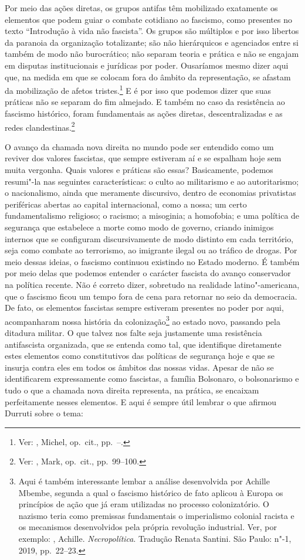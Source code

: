 Por meio das ações diretas, os grupos antifas têm mobilizado
exatamente os elementos que podem guiar o combate cotidiano ao fascismo,
como presentes no texto ``Introdução à vida não fascista''. Os
grupos são múltiplos e por isso libertos da paranoia da organização
totalizante; são não hierárquicos e agenciados entre si também
de modo não burocrático; não separam teoria e prática e não se engajam
em disputas institucionais e jurídicas por poder. Ousaríamos mesmo dizer
aqui que, na medida em que se colocam fora do âmbito da representação,
se afastam da mobilização de afetos tristes.\footnote{Ver:
  , Michel, op.~cit., pp.~--.} E é por isso que podemos dizer que suas
práticas não se separam do fim almejado. E também no caso da resistência
ao fascismo histórico, foram fundamentais as ações diretas,
descentralizadas e as redes clandestinas.\footnote{Ver: , Mark, op.~cit., pp.~99--100.}

O avanço da chamada nova direita no mundo pode ser entendido como um
reviver dos valores fascistas, que sempre estiveram aí e se espalham
hoje sem muita vergonha. Quais valores e práticas são essas?
Basicamente, podemos resumi"-la nas seguintes características: o culto ao
militarismo e ao autoritarismo; o nacionalismo, ainda que meramente
discursivo, dentro de economias privatistas periféricas abertas ao
capital internacional, como a nossa; um certo fundamentalismo religioso;
o racismo; a misoginia; a homofobia; e uma política de segurança que
estabelece a morte como modo de governo, criando inimigos internos que se
configuram discursivamente de modo distinto em cada território, seja como
combate ao terrorismo, ao imigrante ilegal ou ao tráfico de drogas. Por
meio dessas ideias, o fascismo continuou existindo no Estado moderno. É
também por meio delas que podemos entender o carácter fascista do avanço
conservador na política recente. Não é correto dizer, sobretudo na
realidade latino"-americana, que o fascismo ficou um tempo fora de cena
para retornar no seio da democracia. De fato, os elementos fascistas
sempre estiveram presentes no poder por aqui, acompanharam nossa
história da colonização\footnote{Aqui é também interessante lembar a
  análise desenvolvida por Achille Mbembe, segunda a qual o fascismo
  histórico de fato aplicou à Europa os princípios de ação que já eram
  utilizadas no processo colonizatório. O nazismo teria como premissas
  fundamentais o imperialismo colonial racista e os mecanismos
  desenvolvidos pela própria revolução industrial. Ver, por exemplo:
  , Achille. \emph{Necropolítica}. Tradução Renata Santini. São Paulo:
  n"-1, 2019, pp.~22--23.} ao estado novo, passando pela ditadura militar.
O que talvez nos falte seja justamente uma resistência antifascista
organizada, que se entenda como tal, que identifique diretamente estes
elementos como constitutivos das políticas de segurança hoje e que se
insurja contra eles em todos os âmbitos das nossas vidas. Apesar de não
se identificarem expressamente como fascistas, a família Bolsonaro, o
bolsonarismo e tudo o que a chamada nova direita representa, na
prática, se encaixam perfeitamente nesses elementos. E aqui é sempre
útil lembrar o que afirmou Durruti sobre o tema:

